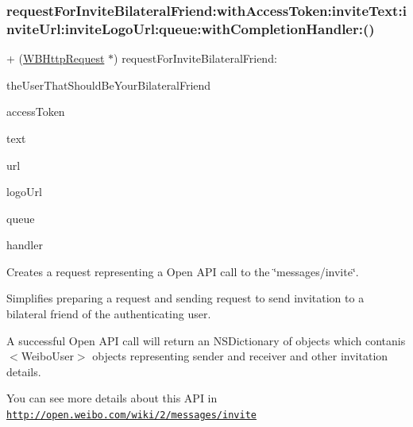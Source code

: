 \subsubsection{\texorpdfstring{request\+For\+Invite\+Bilateral\+Friend\+:with\+Access\+Token\+:invite\+Text\+:invite\+Url\+:invite\+Logo\+Url\+:queue\+:with\+Completion\+Handler\+:()}{requestForInviteBilateralFriend:withAccessToken:inviteText:inviteUrl:inviteLogoUrl:queue:withCompletionHandler:()}\hspace{0.1cm}{\footnotesize\ttfamily [3/3]}}
{\footnotesize\ttfamily + (\mbox{\hyperlink{interface_w_b_http_request}{W\+B\+Http\+Request}} $\ast$) request\+For\+Invite\+Bilateral\+Friend\+: \begin{DoxyParamCaption}\item[{(N\+S\+String $\ast$)}]{the\+User\+That\+Should\+Be\+Your\+Bilateral\+Friend }\item[{withAccessToken:(N\+S\+String $\ast$)}]{access\+Token }\item[{inviteText:(N\+S\+String $\ast$)}]{text }\item[{inviteUrl:(N\+S\+String $\ast$)}]{url }\item[{inviteLogoUrl:(N\+S\+String $\ast$)}]{logo\+Url }\item[{queue:(N\+S\+Operation\+Queue $\ast$)}]{queue }\item[{withCompletionHandler:(W\+B\+Request\+Handler)}]{handler }\end{DoxyParamCaption}}

Creates a request representing a Open A\+PI call to the \char`\"{}messages/invite\char`\"{}.

Simplifies preparing a request and sending request to send invitation to a bilateral friend of the authenticating user.

A successful Open A\+PI call will return an N\+S\+Dictionary of objects which contanis $<$\+Weibo\+User$>$ objects representing sender and receiver and other invitation details.

You can see more details about this A\+PI in \href{http://open.weibo.com/wiki/2/messages/invite}{\tt http\+://open.\+weibo.\+com/wiki/2/messages/invite}


